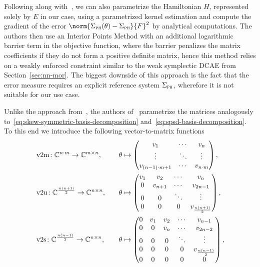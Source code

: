 Following along with~\cite{Najnudel2021}, we can also parametrize the Hamiltonian $H$, represented solely by $E$ in our case, using a parametrized kernel estimation and compute the gradient of the error $\norm{\Sigma_\msc{ph}(\theta) - \Sigma_\msc{ph}}{F}^2$ by analytical computations.
The authors then use an Interior Points Method with an additional logarithmic barrier term in the objective function, where the barrier penalizes the matrix coefficients if they do not form a positive definite matrix, hence this method relies on a weakly enforced constraint similar to the weak symplectic \ac{DCAE} from Section~\ref{sec:nn-mor}.
The biggest downside of this approach is the fact that the error measure requires an explicit reference system $\Sigma_{\textnormal{\scshape ph}}$, wherefore it is not suitable for our use case.

Unlike the approach from~\cite{Najnudel2021}, the authors of~\cite{Schwerdtner2021, SV2021, Schwerdtner2023, SV2023} parametrize the matrices analogously to~\eqref{eq:skew-symmetric-basis-decomposition} and~\eqref{eq:spsd-basis-decomposition}.
To this end we introduce the following vector-to-matrix functions
\begin{alignat}{4}
    &\mathop{}\!\mathrm{v}2\mathrm{m} \colon \mathbb{C}^{n \cdot m} \to \mathbb{C}^{m \times n},\quad &&\theta \mapsto \begin{pmatrix}
        v_1 & \cdots & v_n \\
        \vdots & \ddots & \vdots \\
        v_{(n - 1) \cdot m + 1} & \cdots & v_{n \cdot m}
    \end{pmatrix}, \label{eq:v2m}\\
    &\mathop{}\!\mathrm{v}2\mathrm{u} \colon \mathbb{C}^{\frac{n (n + 1)}{2}} \to \mathbb{C}^{n \times n},\quad &&\theta \mapsto \begin{pmatrix}
        v_1 & v_2 & \cdots & v_n \\
        0 & v_{n + 1} & \cdots & v_{2n - 1} \\
        0 & 0 & \ddots & \vdots \\
        0 & 0 & 0 & v_{\frac{n (n + 1)}{2}}
    \end{pmatrix}, \label{eq:v2u}\\
    &\mathop{}\!\mathrm{v}2\mathrm{s} \colon \mathbb{C}^{\frac{n (n - 1)}{2}} \to \mathbb{C}^{n \times n},\quad &&\theta \mapsto \begin{pmatrix}
        0 & v_1 & v_2 & \cdots & v_{n - 1} \\
        0 & 0 & v_n & \cdots & v_{2n - 2} \\
        0 & 0 & 0 & \ddots & \vdots \\
        0 & 0 & 0 & 0 & v_{\frac{n (n - 1)}{2}} \\
        0 & 0 & 0 & 0 & 0
    \end{pmatrix}, \label{eq:v2s}
\end{alignat}
